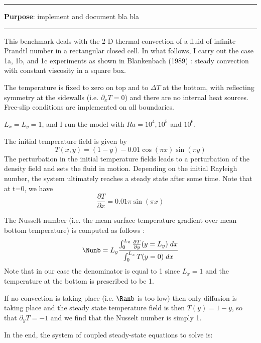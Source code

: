 \par\noindent\rule{\textwidth}{0.4pt}

{\bf \color{teal} Purpose}: implement and document bla bla 

\par\noindent\rule{\textwidth}{0.4pt}



This benchmark deals with the 2-D thermal convection of a fluid 
of infinite Prandtl number in a rectangular closed cell.
In what follows, I carry out the case 1a, 1b, and 1c experiments as shown in 
Blankenbach \etal (1989) \cite{blbc89}:
steady convection with constant viscosity in a square box.

The temperature is fixed to zero on top and to $\Delta T$ at the bottom, 
with reflecting symmetry at the sidewalls (i.e. $\partial_x T=0$) 
and there are no internal heat sources. 
Free-slip conditions are implemented on all boundaries. 


$L_x=L_y=1$,
and I run the model with $Ra=10^4,10^{5}$ and $10^6$.

The initial temperature field is given by 
\begin{equation}
T(x,y)=(1-y) - 0.01\cos(\pi x) \sin(\pi y)
\end{equation}
The perturbation in the initial temperature fields leads to 
a perturbation of the density field and sets the fluid in motion. 
Depending on the initial Rayleigh number, the system ultimately reaches a 
steady state after some time. 
Note that at t=0, we have
\[
\frac{\partial T}{\partial x} = 0.01 \pi \sin(\pi x)
\]

The Nusselt number (i.e. the mean surface temperature gradient over 
mean bottom temperature)
is computed as follows \cite{blbc89}:
\begin{equation}
\Nunb = L_y \frac{\int_0^{L_x} \frac{\partial T}{\partial y}(y=L_y) \; dx  }{\int_0^{L_x} T(y=0) \; dx}
\label{eqNu}
\end{equation}
Note that in our case the denominator is equal to 1 since $L_x=1$ 
and the temperature at the bottom is prescribed to be 1.

If no convection is taking place (i.e. $\Ranb$ is too low) then 
only diffusion is taking place 
and the steady state temperature field is then $T(y)=1-y$, 
so that $\partial_y T=-1$ and we find that the Nusselt number is simply 1.

In the end, the system of coupled steady-state equations to solve is:

